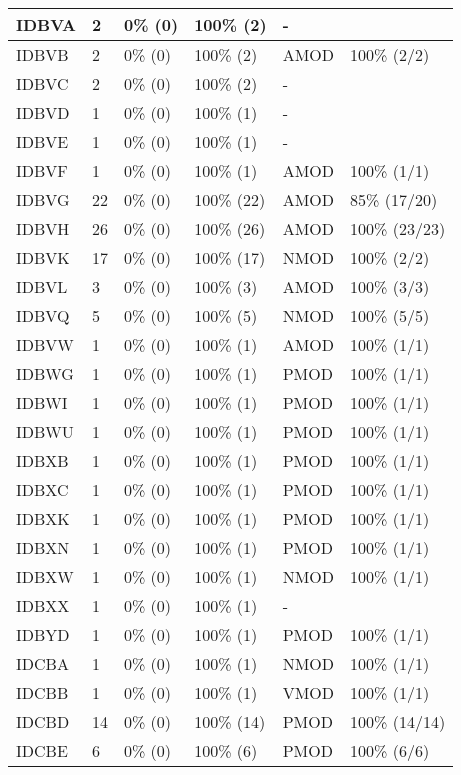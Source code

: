 \begin{figure*}
\begin{tabular}{|l|l|l|l||l|l|}
\hline
 IDBVA & 2 & 0\% (0) & 100\% (2) & - &  \\ 
\hline
 IDBVB & 2 & 0\% (0) & 100\% (2) & AMOD & 100\% (2/2) \\ 
\hline
 IDBVC & 2 & 0\% (0) & 100\% (2) & - &  \\ 
\hline
 IDBVD & 1 & 0\% (0) & 100\% (1) & - &  \\ 
\hline
 IDBVE & 1 & 0\% (0) & 100\% (1) & - &  \\ 
\hline
 IDBVF & 1 & 0\% (0) & 100\% (1) & AMOD & 100\% (1/1) \\ 
\hline
 IDBVG & 22 & 0\% (0) & 100\% (22) & AMOD & 85\% (17/20) \\ 
\hline
 IDBVH & 26 & 0\% (0) & 100\% (26) & AMOD & 100\% (23/23) \\ 
\hline
 IDBVK & 17 & 0\% (0) & 100\% (17) & NMOD & 100\% (2/2) \\ 
\hline
 IDBVL & 3 & 0\% (0) & 100\% (3) & AMOD & 100\% (3/3) \\ 
\hline
 IDBVQ & 5 & 0\% (0) & 100\% (5) & NMOD & 100\% (5/5) \\ 
\hline
 IDBVW & 1 & 0\% (0) & 100\% (1) & AMOD & 100\% (1/1) \\ 
\hline
 IDBWG & 1 & 0\% (0) & 100\% (1) & PMOD & 100\% (1/1) \\ 
\hline
 IDBWI & 1 & 0\% (0) & 100\% (1) & PMOD & 100\% (1/1) \\ 
\hline
 IDBWU & 1 & 0\% (0) & 100\% (1) & PMOD & 100\% (1/1) \\ 
\hline
 IDBXB & 1 & 0\% (0) & 100\% (1) & PMOD & 100\% (1/1) \\ 
\hline
 IDBXC & 1 & 0\% (0) & 100\% (1) & PMOD & 100\% (1/1) \\ 
\hline
 IDBXK & 1 & 0\% (0) & 100\% (1) & PMOD & 100\% (1/1) \\ 
\hline
 IDBXN & 1 & 0\% (0) & 100\% (1) & PMOD & 100\% (1/1) \\ 
\hline
 IDBXW & 1 & 0\% (0) & 100\% (1) & NMOD & 100\% (1/1) \\ 
\hline
 IDBXX & 1 & 0\% (0) & 100\% (1) & - &  \\ 
\hline
 IDBYD & 1 & 0\% (0) & 100\% (1) & PMOD & 100\% (1/1) \\ 
\hline
 IDCBA & 1 & 0\% (0) & 100\% (1) & NMOD & 100\% (1/1) \\ 
\hline
 IDCBB & 1 & 0\% (0) & 100\% (1) & VMOD & 100\% (1/1) \\ 
\hline
 IDCBD & 14 & 0\% (0) & 100\% (14) & PMOD & 100\% (14/14) \\ 
\hline
 IDCBE & 6 & 0\% (0) & 100\% (6) & PMOD & 100\% (6/6) \\ 
\hline
\end{tabular}
\end{figure*}
